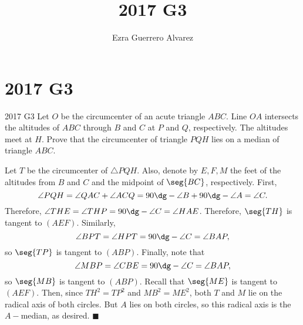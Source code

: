 \documentclass[14pt]{article}
\title{2017 G3}
\author{Ezra Guerrero Alvarez}
\begin{document}
\maketitle
	
\section*{2017 G3}

\begin{statement}{2017 G3}
	Let $O$ be the circumcenter of an acute triangle $ABC$. Line $OA$ intersects the altitudes of $ABC$ through $B$ and $C$ at $P$ and $Q$, respectively. The altitudes meet at $H$. Prove that the circumcenter of triangle $PQH$ lies on a median of triangle $ABC$.
\end{statement}
Let $T$ be the circumcenter of $\triangle PQH$. Also, denote by $E,F,M$ the feet of the altitudes from $B$ and $C$ and the midpoint of $\seg{BC}$, respectively. First, 
\[ \angle PQH = \angle QAC + \angle ACQ = 90\dg-\angle B+90\dg-\angle A=\angle C. \]
Therefore, $\angle THE = \angle THP = 90\dg-\angle C = \angle HAE$. Therefore, $\seg{TH}$ is tangent to $(AEF)$. Similarly,
\[ \angle BPT = \angle HPT = 90\dg-\angle C = \angle BAP, \]
so $\seg{TP}$ is tangent to $(ABP)$. Finally, note that 
\[ \angle MBP = \angle CBE = 90\dg-\angle C = \angle BAP, \]
so $\seg{MB}$ is tangent to $(ABP)$. Recall that $\seg{ME}$ is tangent to $(AEF)$. Then, since $TH^2=TP^2$ and $MB^2=ME^2$, both $T$ and $M$ lie on the radical axis of both circles. But $A$ lies on both circles, so this radical axis is the $A-$median, as desired. $\blacksquare$	
\end{document}

